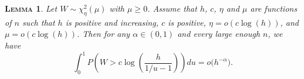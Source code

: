 \documentclass[
  12pt]{article}
\newtheorem{lem}[thm]{\textsc{Lemma}}
\begin{document}


\begin{lem}\label{lemma:s20}
 Let $W\sim \chi_\eta^2(\mu)$ with $\mu \geq 0$. Assume that $h$, $c$, $\eta$ and $\mu$ are functions of $n$ such that $h$ is positive and increasing, $c$ is positive, $\eta=o(c\log(h))$, and $\mu=o(c\log(h))$. Then for any $\alpha\in(0,1)$ and every large enough $n$, we have
$$
\int_0^1 P\left(W>c \log \left(\frac{h}{1 / u-1}\right)\right) d u = o\big(  h^{-\alpha}\big).$$
\end{lem}
\end{document}
